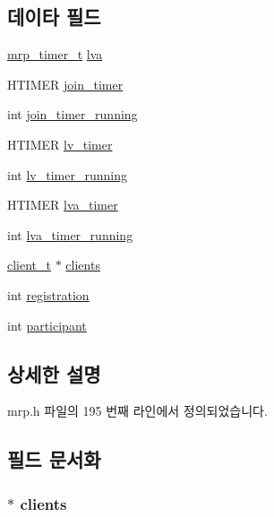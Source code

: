 \subsection*{데이타 필드}
\begin{DoxyCompactItemize}
\item 
\hyperlink{mrp_8h_a8364aeb9c500a6a82b1936d7b372bcbc}{mrp\+\_\+timer\+\_\+t} \hyperlink{structmrp__database_aefeb3936cf0a8963a3e1646e35b291e9}{lva}
\item 
H\+T\+I\+M\+ER \hyperlink{structmrp__database_a55eea88044cf545b4b60f7a851e2ca4e}{join\+\_\+timer}
\item 
int \hyperlink{structmrp__database_a83c767737796901ce98b40bac61d3693}{join\+\_\+timer\+\_\+running}
\item 
H\+T\+I\+M\+ER \hyperlink{structmrp__database_afb0e407756ab2688bbd60efbbdcc66d4}{lv\+\_\+timer}
\item 
int \hyperlink{structmrp__database_a9b16e9e1e481156a56686fb632d06263}{lv\+\_\+timer\+\_\+running}
\item 
H\+T\+I\+M\+ER \hyperlink{structmrp__database_a63013eac35405517020e4681a260d06d}{lva\+\_\+timer}
\item 
int \hyperlink{structmrp__database_a80208a6b8c69dfec5b433adb2edfd471}{lva\+\_\+timer\+\_\+running}
\item 
\hyperlink{mrp_8h_a8db229da62af6e778b15d0dfeab62c2d}{client\+\_\+t} $\ast$ \hyperlink{structmrp__database_a32ba484209aea1112a353d0bbed96816}{clients}
\item 
int \hyperlink{structmrp__database_a76843f7fb36637f07903bdab30dd3658}{registration}
\item 
int \hyperlink{structmrp__database_a08ed403eabc8682a01da8a737ac32c31}{participant}
\end{DoxyCompactItemize}


\subsection{상세한 설명}


mrp.\+h 파일의 195 번째 라인에서 정의되었습니다.



\subsection{필드 문서화}
\subsubsection[{\texorpdfstring{clients}{clients}}]{$\ast$ clients}\hypertarget{structmrp__database_a32ba484209aea1112a353d0bbed96816}{}\label{structmrp__database_a32ba484209aea1112a353d0bbed96816}


